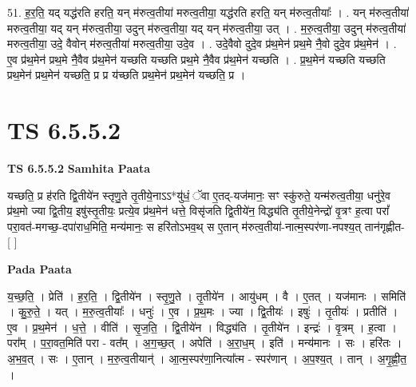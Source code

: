 \documentclass[17pt]{extarticle}
\begin{document}
51. ह॒र॒ति॒ यद् यद्ध॑रति हरति॒ यन् म॑रुत्व॒तीया॑ मरुत्व॒तीया॒ यद्ध॑रति हरति॒ यन् म॑रुत्व॒तीयाः᳚ । . यन् म॑रुत्व॒तीया॑ मरुत्व॒तीया॒ यद् यन् म॑रुत्व॒तीया॒ उदुन् म॑रुत्व॒तीया॒ यद् यन् म॑रुत्व॒तीया॒ उत् । . म॒रु॒त्व॒तीया॒ उदुन् म॑रुत्व॒तीया॑ मरुत्व॒तीया॒ उदे॒ वैवोन् म॑रुत्व॒तीया॑ मरुत्व॒तीया॒ उदे॒व । . उदे॒वैवो दुदे॒व प्र॑थ॒मेन॑ प्रथ॒मे नै॒वो दुदे॒व प्र॑थ॒मेन॑ । . ए॒व प्र॑थ॒मेन॑ प्रथ॒मे नै॒वैव प्र॑थ॒मेन॑ यच्छति यच्छति प्रथ॒मे नै॒वैव प्र॑थ॒मेन॑ यच्छति । . प्र॒थ॒मेन॑ यच्छति यच्छति प्रथ॒मेन॑ प्रथ॒मेन॑ यच्छति॒ प्र प्र य॑च्छति प्रथ॒मेन॑ प्रथ॒मेन॑ यच्छति॒ प्र । \newline
\pagebreak
{}

\section{ TS 6.5.5.2 }

\textbf{TS 6.5.5.2 } \newline
\textbf{Samhita Paata} \newline

यच्छति॒ प्र ह॑रति द्वि॒तीये॑न स्तृणु॒ते तृ॒तीये॒नाऽऽ*यु॑धं॒ ॅवा ए॒तद्-यज॑मानः॒ सꣳ स्कु॑रुते॒ यन्म॑रुत्व॒तीया॒ धनु॑रे॒व प्र॑थ॒मो ज्या द्वि॒तीय॒ इषु॑स्तृ॒तीयः॒ प्रत्ये॒व प्र॑थ॒मेन॑ धत्ते॒ विसृ॑जति द्वि॒तीये॑न॒ विद्ध्य॑ति तृ॒तीये॒नेन्द्रो॑ वृ॒त्रꣳ ह॒त्वा परां᳚ परा॒वत॑-मगच्छ॒-दपा॑राध॒मिति॒ मन्य॑मानः॒ स हरि॑तोऽभव॒थ् स ए॒तान् म॑रुत्व॒तीया॑-नात्म॒स्पर॑णा-नपश्य॒त् तान॑गृह्णीत- [  ] \newline

\textbf{Pada Paata} \newline

य॒च्छ॒ति॒ । प्रेति॑ । ह॒र॒ति॒ । द्वि॒तीये॑न । स्तृ॒णु॒ते । तृ॒तीये॑न । आयु॑धम् । वै । ए॒तत् । यज॑मानः । समिति॑ । कु॒रु॒ते॒ । यत् । म॒रु॒त्व॒तीयाः᳚ । धनुः॑ । ए॒व । प्र॒थ॒मः । ज्या । द्वि॒तीयः॑ । इषुः॑ । तृ॒तीयः॑ । प्रतीति॑ । ए॒व । प्र॒थ॒मेन॑ । ध॒त्ते॒ । वीति॑ । सृ॒ज॒ति॒ । द्वि॒तीये॑न । विद्ध्य॑ति । तृ॒तीये॑न । इन्द्रः॑ । वृ॒त्रम् । ह॒त्वा । परा᳚म् । प॒रा॒वत॒मिति॑ परा - वत᳚म् । अ॒ग॒च्छ॒त् । अपेति॑ । अ॒रा॒ध॒म् । इति॑ । मन्य॑मानः । सः । हरि॑तः । अ॒भ॒व॒त् । सः । ए॒तान् । म॒रु॒त्व॒तीयान्॑ । आ॒त्म॒स्पर॑णा॒नित्या᳚त्म - स्पर॑णान् । अ॒प॒श्य॒त् । तान् । अ॒गृ॒ह्णी॒त॒ ।  \newline
\end{document}
